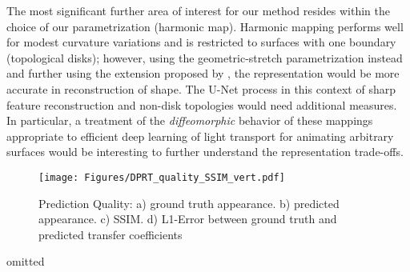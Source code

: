 The most significant further area of interest for our method resides within the choice of our parametrization (harmonic map). Harmonic mapping performs well for modest curvature variations and is restricted to surfaces with one boundary (topological disks); however, using the geometric-stretch parametrization instead and further using the extension proposed by \cite{Spherical_Parametrization}, the representation would be more accurate in reconstruction of shape. The U-Net process in this context of sharp feature reconstruction and non-disk topologies would need additional measures. In particular, a treatment of the \textit{diffeomorphic} behavior \cite{detlefsen2018transformations} of these mappings appropriate to efficient deep learning of light transport for animating arbitrary surfaces would be interesting to further understand the representation trade-offs.
\begin{figure}[H]
  \centering
    \texttt{[image: Figures/DPRT\_quality\_SSIM\_vert.pdf]}
     \caption{Prediction Quality:
     a) ground truth appearance. b) predicted appearance. c) SSIM. d) L1-Error between ground truth and predicted transfer coefficients }
     \label{Fig: DPRT_Quality}
\end{figure}

\begin{acks}
omitted
\end{acks}